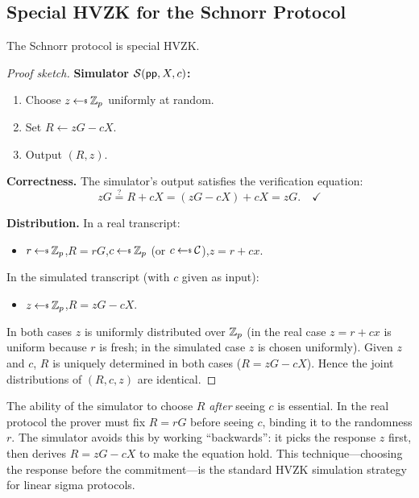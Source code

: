 \documentclass[11pt]{article}
\begin{document}
\subsection{Special HVZK for the Schnorr Protocol}

\begin{theorem}
\label{thm:schnorr-hvzk}
The Schnorr protocol is special HVZK.
\end{theorem}

\begin{proof}[Proof sketch]
\textbf{Simulator $\mathcal{S}(\mathsf{pp}, X, c)$:}
\begin{enumerate}
  \item Choose $z \getsr \Z_p$ uniformly at random.
  \item Set $R \leftarrow zG - cX$.
  \item Output $(R, z)$.
\end{enumerate}

\noindent\textbf{Correctness.}  The simulator's output satisfies the
verification equation:
\[
  zG \stackrel{?}{=} R + cX = (zG - cX) + cX = zG. \quad\checkmark
\]

\noindent\textbf{Distribution.}  In a real transcript:
\begin{itemize}
  \item $r \getsr \Z_p$,\quad $R = rG$,\quad $c \getsr \Z_p$
        (or $c \getsr \mathcal{C}$),\quad $z = r + cx$.
\end{itemize}
In the simulated transcript (with $c$ given as input):
\begin{itemize}
  \item $z \getsr \Z_p$,\quad $R = zG - cX$.
\end{itemize}
In both cases $z$ is uniformly distributed over $\mathbb{Z}_p$ (in the real case $z =
r + cx$ is uniform because $r$ is fresh; in the simulated case $z$ is chosen
uniformly).  Given $z$ and $c$, $R$ is uniquely determined in both cases
($R = zG - cX$).  Hence the joint distributions of $(R, c, z)$ are identical.
\end{proof}

\begin{remark}
  The ability of the simulator to choose $R$ \emph{after} seeing $c$ is
  essential.  In the real protocol the prover must fix $R = rG$ before
  seeing $c$, binding it to the randomness $r$.  The simulator avoids this
  by working ``backwards'': it picks the response $z$ first, then derives
  $R = zG - cX$ to make the equation hold.  This technique---choosing the
  response before the commitment---is the standard HVZK simulation strategy
  for linear sigma protocols.
\end{remark}
\end{document}
